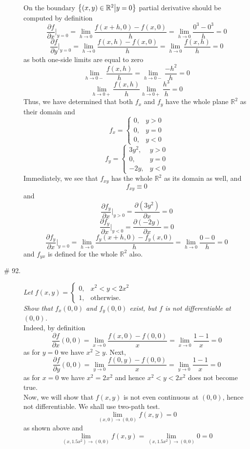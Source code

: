\documentclass[8pt]{article} %
\begin{document}
\begin{description}
{			On the boundary $\left\{(x,y)\in\mathbb{R}^2\big| y=0\right\}$ partial derivative should be computed by definition
			\[\frac{\partial f}{\partial x}\bigg|_{y=0}=\lim_{h\to0}\frac{f(x+h,0)-f(x,0)}{h}=\lim_{h\to 0}\frac{0^3-0^3}
			{h}=0\]
			\[\frac{\partial f}{\partial y}\bigg|_{y=0}=\lim_{h\to0}\frac{f(x,h)-f(x,0)}{h}=\lim_{h\to 0}\frac{f(x,h)}{h
			}=0\]
			as both one-side limits are equal to zero
			\[\lim_{h\to 0-}\frac{f(x,h)}{h}=\lim_{h\to0-}\frac{-h^2}{h}=0\]
			\[\lim_{h\to 0+}\frac{f(x,h)}{h}\lim_{h\to0+}\frac{h^3}{h}=0\]
			Thus, we have determined that both $f_x$ and $f_y$ have the whole plane $\mathbb{R}^2$ as their domain and
			\[f_x=\left\{\begin{array}{ll}0,&y>0\\0,&y=0\\0,&y<0\end{array}\right.\]
			\[f_y=\left\{\begin{array}{ll}3y^2,&y>0\\0,&y=0\\-2y,&y<0\end{array}\right.\]
			Immediately, we see that $f_{xy}$ has the whole $\mathbb{R}^2$ as its domain as well, and
			\[f_{xy}\equiv0\]
			and 
			\[\frac{\partial f_y}{\partial x}\bigg|_{y>0}=\frac{\partial (3y^2)}{\partial x}=0\]
			\[\frac{\partial f_y}{\partial x}\bigg|_{y<0}=\frac{\partial (-2y)}{\partial x}=0\]
			\[\frac{\partial f_y}{\partial x}\bigg|_{y=0}=\lim_{h\to0}\frac{f_y(x+h,0)-f_y(x,0)}{h}=\lim_{h\to 0}
			\frac{0-0}{h}=0\]
			and $f_{yx}$ is defined for the whole $\mathbb{R}^2$ also.
		}
	\item[\# 92.]{{\it Let} $f(x,y)=\left\{\begin{array}{ll}0,&x^2<y<2x^2\\1,&\mbox{otherwise.}\end{array}\right.$\\
			{\it Show that $f_x(0,0)$ and $f_y(0,0)$ exist, but $f$ is not differentiable at $(0,0)$.}\\
			Indeed, by definition
			\[\frac{\partial f}{\partial x}(0,0)=\lim_{x\to0}\frac{f(x,0)-f(0,0)}{x}=\lim_{x\to0}\frac{1-1}{x}=0\]
			as for $y=0$ we have $x^2\geq y$. Next,
			\[\frac{\partial f}{\partial y}(0,0)=\lim_{y\to0}\frac{f(0,y)-f(0,0)}{x}=\lim_{y\to0}\frac{1-1}{x}=0\]
			as for $x=0$ we have $x^2=2x^2$ and hence $x^2<y<2x^2$ does not become true.\\
			Now, we will show that $f(x,y)$ is not even continuous at $(0,0)$, hence not differentiable. We shall use
		 	two-path test.
			\[\lim_{(x,0)\to(0,0)}f(x,y)=0\]
			as shown above and
			\[\lim_{(x,1.5x^2)\to(0,0)}f(x,y)=\lim_{(x,1.5x^2)\to(0,0)} 0=0\]
		}
\end{description}
\end{document}
